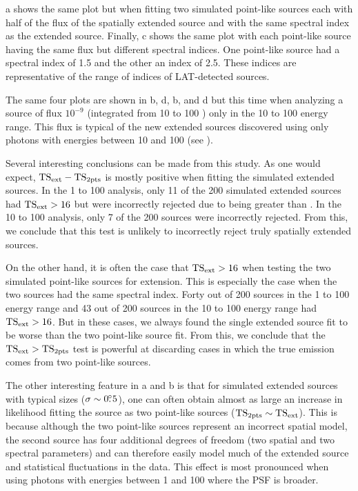a shows the same plot but when fitting
two simulated point-like sources each with half of the flux of
the spatially extended source and with the same spectral index as the
extended source.  Finally, c shows the same
plot with each point-like source having the same flux but different
spectral indices.  One point-like source had a spectral index of 1.5
and the other an index of 2.5.
These indices are representative of the range of indices of LAT-detected
sources.

The same four plots are shown in b, d, 
b, and d but this
time when analyzing a source of flux $10^{-9}$ \fluxunits (integrated from
10 \gev to 100 \gev) only in the 10 \gev to 100 \gev energy range.
This flux is typical of the new extended sources discovered
using only photons with energies between 10 \gev and 100 \gev (see
).

Several interesting conclusions can be made from this study.  As one would
expect, $\mathrm{TS}_\mathrm{ext}-\mathrm{TS}_{\mathrm{2pts}}$ is mostly positive when fitting the simulated
extended sources.  In the 1 \gev to 100 \gev analysis, only 11 of the
200 simulated extended sources had $\mathrm{TS}_\mathrm{ext}>16$ but were incorrectly
rejected due to \tsinc being greater than \tsext.  In the 10 \gev to 100 \gev
analysis, only 7 of the 200 sources were incorrectly rejected. From this,
we conclude that this test is unlikely to incorrectly reject truly
spatially extended sources.

On the other hand, 
it is often
the case that $\mathrm{TS}_\mathrm{ext}>16$ when testing the 
two simulated point-like sources
for extension.  This is especially the case
when the two sources had the same spectral index. Forty out of 200 sources
in the 1 \gev to 100 \gev energy range and 43 out of 200 sources in the
10 \gev to 100 \gev energy range had $\mathrm{TS}_\mathrm{ext}>16$.  But in these cases,
we always found the single extended source fit to be worse than
the two point-like source fit.  From this, we conclude that the $\mathrm{TS}_\mathrm{ext}>\mathrm{TS}_{\mathrm{2pts}}$
test is powerful at discarding cases in which the true emission comes
from two point-like sources.


The other interesting feature in a
and b is that for simulated extended
sources with typical sizes ($\sigma\sim0\mbox{$.\!\!^\circ$}5$), one can often obtain
almost as large an increase in likelihood fitting the source as two
point-like sources ($\mathrm{TS}_{\mathrm{2pts}}\sim\mathrm{TS}_\mathrm{ext}$).  This is because although the
two point-like sources represent an incorrect spatial model, the second
source has four additional degrees of freedom (two spatial and two
spectral parameters) and can therefore easily model much of the extended
source and statistical fluctuations in the data.  This effect is most
pronounced when using photons with energies between 1 \gev and 100 \gev
where the PSF is broader.

